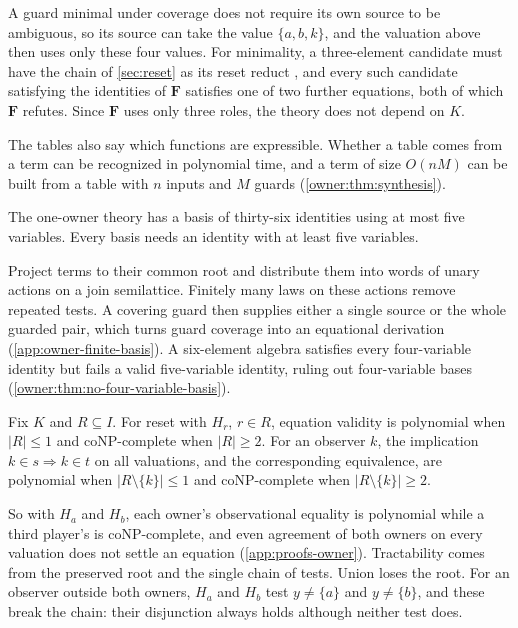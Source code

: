\begin{idea}
A guard minimal under coverage does not require its own source to be ambiguous, so its source can take the value $\{a,b,k\}$, and the valuation above then uses only these four values. For minimality, a three-element candidate must have the chain of \cref{sec:reset} as its reset reduct \cite[Theorem~3.2]{FreeseEtAl2002}, and every such candidate satisfying the identities of $\mathbf F$ satisfies one of two further equations, both of which $\mathbf F$ refutes. Since $\mathbf F$ uses only three roles, the theory does not depend on $K$.
\end{idea}

The tables also say which functions are expressible. Whether a table comes from a term can be recognized in polynomial time, and a term of size $O(nM)$ can be built from a table with $n$ inputs and $M$ guards (\cref{owner:thm:synthesis}).

\begin{theorem}\label{owner:thm:basis-main}
The one-owner theory has a basis of thirty-six identities using at most
five variables. Every basis needs an identity with at least five
variables.
\end{theorem}

\begin{idea}
Project terms to their common root and distribute them into words of
unary actions on a join semilattice. Finitely many laws on these actions
remove repeated tests. A covering guard then supplies either a single
source or the whole guarded pair, which turns guard coverage into an
equational derivation (\cref{app:owner-finite-basis}). A six-element
algebra satisfies every four-variable identity but fails a valid
five-variable identity, ruling out four-variable bases
(\cref{owner:thm:no-four-variable-basis}).
\end{idea}

\begin{corollary}\label{owner:cor:complexity}
Fix $K$ and $R\subseteq I$. For reset with $H_r$, $r\in R$, equation validity is polynomial when $|R|\leq1$ and coNP-complete when $|R|\geq2$. For an observer $k$, the implication $k\in s\Rightarrow k\in t$ on all valuations, and the corresponding equivalence, are polynomial when $|R\setminus\{k\}|\leq1$ and coNP-complete when $|R\setminus\{k\}|\geq2$.
\end{corollary}

So with $H_a$ and $H_b$, each owner's observational equality is polynomial while a third player's is coNP-complete, and even agreement of both owners on every valuation does not settle an equation (\cref{app:proofs-owner}). Tractability comes from the preserved root and the single chain of tests. Union loses the root. For an observer outside both owners, $H_a$ and $H_b$ test $y\ne\{a\}$ and $y\ne\{b\}$, and these break the chain: their disjunction always holds although neither test does.

